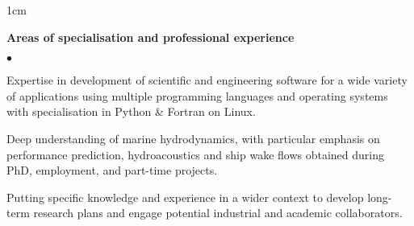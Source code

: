 \documentclass[a4paper,10pt]{article}
\newcommand{\squishlist}{
	\begin{list}{$\bullet$}
	{
		\setlength{\itemsep}{0pt}
		\setlength{\parsep}{0pt}
		\setlength{\topsep}{0pt}
		\setlength{\partopsep}{0pt}
		\setlength{\leftmargin}{2em}
		\setlength{\labelwidth}{1.5em}
		\setlength{\labelsep}{0.5em}
	}
}
\newcommand{\squishend}{\end{list}}
\begin{document}
\begin{minipage}{\textwidth}
\begin{adjustwidth}{}{1cm}

\textbf{Areas of specialisation and professional experience}
\squishlist
	\item Expertise in development of scientific and engineering software for a wide variety
		of applications using multiple programming languages and operating systems with
		specialisation in Python \& Fortran on Linux.
	\item Deep understanding of marine hydrodynamics, with particular emphasis on
		performance prediction, hydroacoustics and ship wake flows obtained during PhD, employment, and part-time projects.
	\item Putting specific knowledge and experience in a wider context to develop long-term research plans and engage potential industrial and academic collaborators.
\squishend


\end{adjustwidth}
\end{minipage}
\end{document}
